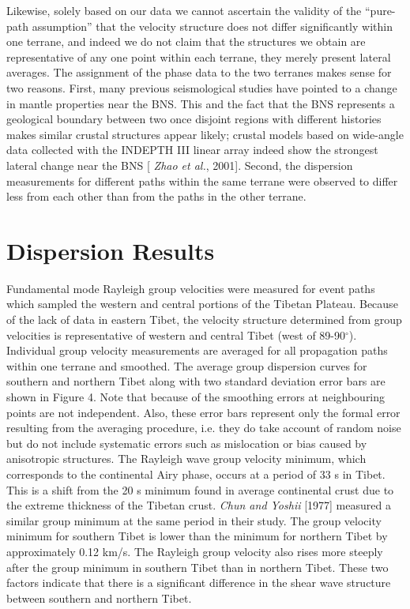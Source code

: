 \documentclass[12pt]{article}
\begin{document}
Likewise, solely based on our data we cannot ascertain the validity of the
  ``pure-path assumption'' that the
  velocity structure does not differ significantly within one terrane, and
  indeed we do not claim that the structures we obtain are representative of any
  one point within each terrane, they merely present lateral averages.  The
  assignment of the phase data to the two terranes makes sense for two reasons.
First, many previous seismological studies have pointed to a change in mantle
  properties near the BNS.  This and the
  fact that the BNS represents a geological boundary between two once disjoint
  regions with different histories makes similar crustal
  structures appear likely; crustal models based on wide-angle data collected with the INDEPTH
  III linear array indeed show the strongest lateral change near the BNS [{\it
    Zhao et al.}, 2001].  Second, the dispersion measurements for different paths within the same terrane
  were observed to differ less from each other than from the paths
  in the other terrane.


\section{Dispersion Results} 

Fundamental mode Rayleigh group velocities were measured for event paths which sampled the western and 
central portions of the Tibetan Plateau. Because of the lack of data in eastern Tibet, the velocity 
structure determined from group velocities is representative of western and central Tibet (west of 
89-90$^\circ$).  Individual group velocity measurements are averaged for all propagation 
paths within one terrane and smoothed.   The average group dispersion curves for southern and northern Tibet along with 
two standard deviation error bars are shown in Figure 4.  Note that because of the smoothing errors at neighbouring points are not independent. Also, these error bars represent only the formal error resulting from the averaging procedure, i.e. they do take account of random noise but do not include systematic errors such as mislocation or bias caused by anisotropic structures.  The Rayleigh wave group velocity minimum, which 
corresponds to the continental Airy phase, occurs at a period of 33 s in Tibet.  This is a shift from the 
20 s minimum found in average continental crust due to the extreme thickness of the Tibetan crust.  {\it 
Chun and Yoshii} [1977] measured a similar group minimum at the same period in their study. The group 
velocity minimum for southern Tibet is lower than the minimum for northern Tibet by approximately 0.12 
km/s.  The Rayleigh group velocity also rises more steeply after the group minimum in southern Tibet than 
in northern Tibet.  These two factors indicate that there is a significant difference in the shear wave 
structure between southern and northern Tibet. 
\end{document}
